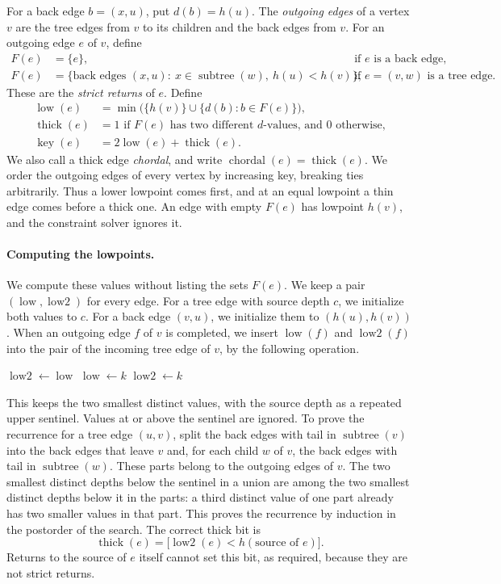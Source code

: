 \documentclass[11pt]{article}
\DeclareMathOperator{\low}{low}
\DeclareMathOperator{\lowtwo}{low2}
\DeclareMathOperator{\thick}{thick}
\DeclareMathOperator{\chordal}{chordal}
\DeclareMathOperator{\key}{key}
\DeclareMathOperator{\subtree}{subtree}
\begin{document}
For a back edge $b=(x,u)$, put $d(b)=h(u)$. The \emph{outgoing edges} of a
vertex $v$ are the tree edges from $v$ to its children and the back edges
from $v$. For an outgoing edge $e$ of $v$, define
\begin{align*}
F(e)&=\{e\}, &&\text{if $e$ is a back edge,}\\
F(e)&=\{\text{back edges }(x,u):\ x\in\subtree(w),\ h(u)<h(v)\},
&&\text{if $e=(v,w)$ is a tree edge.}
\end{align*}
These are the \emph{strict returns} of $e$. Define
\begin{align*}
\low(e)&=\min\bigl(\{h(v)\}\cup\{d(b):b\in F(e)\}\bigr),\\
\thick(e)&=1\text{ if $F(e)$ has two different $d$-values, and $0$ otherwise,}\\
\key(e)&=2\low(e)+\thick(e).
\end{align*}
We also call a thick edge \emph{chordal}, and write
$\chordal(e)=\thick(e)$. We order the outgoing edges of every vertex by
increasing key, breaking ties arbitrarily. Thus a lower lowpoint comes first,
and at an equal lowpoint a thin edge comes before a thick one. An edge with
empty $F(e)$ has lowpoint $h(v)$, and the constraint solver ignores it.

\paragraph{Computing the lowpoints.}
We compute these values without listing the sets $F(e)$. We keep a pair
$(\low,\lowtwo)$ for every edge. For a tree edge with source depth $c$, we
initialize both values to $c$. For a back edge $(v,u)$, we initialize them to
$(h(u),h(v))$. When an outgoing edge $f$ of $v$ is completed, we insert
$\low(f)$ and $\lowtwo(f)$ into the pair of the incoming tree edge of $v$, by
the following operation.
\begin{algorithmic}[1]
\If{$k<\low$}
\State $\lowtwo\gets\low$
\State $\low\gets k$
\ElsIf{$\low<k$ and $k<\lowtwo$}
\State $\lowtwo\gets k$
\EndIf
\EndFunction
\end{algorithmic}
This keeps the two smallest distinct values, with the source depth as a
repeated upper sentinel. Values at or above the sentinel are ignored. To prove
the recurrence for a tree edge $(u,v)$, split the back edges with tail in
$\subtree(v)$ into the back edges that leave $v$ and, for each child $w$ of
$v$, the back edges with tail in $\subtree(w)$. These parts belong to the
outgoing edges of $v$. The two smallest distinct depths below the sentinel in
a union are among the two smallest distinct depths below it in the parts: a
third distinct value of one part already has two smaller values in that part.
This proves the recurrence by induction in the postorder of the search. The correct thick bit
is
\begin{equation*}
\thick(e)=\bigl[\lowtwo(e)<h(\text{source of }e)\bigr].
\end{equation*}
Returns to the source of $e$ itself cannot set this bit, as required, because
they are not strict returns.
\end{document}
